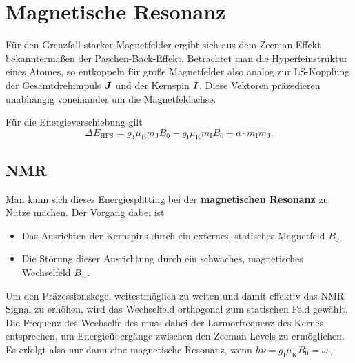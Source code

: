 \section{Magnetische Resonanz}
Für den Grenzfall starker Magnetfelder ergibt sich aus dem Zeeman-Effekt bekanntermaßen der Paschen-Back-Effekt.
Betrachtet man die Hyperfeinstruktur eines Atomes, so entkoppeln für große Magnetfelder also analog zur LS-Kopplung der Gesamtdrehimpuls $\boldsymbol{J}$ und der Kernspin $\boldsymbol{I}$.
Diese Vektoren präzedieren unabhängig voneinander um die Magnetfeldachse.

Für die Energieverschiebung gilt
\begin{equation*}
	\Delta E_\text{HFS} = g_\text{J}\mu_\text{B}m_\text{J}B_0 - g_\text{I}\mu_\text{K}m_\text{I}B_0 + a\cdot m_\text{I}m_\text{J}.
\end{equation*}

\subsection{NMR}
Man kann sich dieses Energiesplitting bei der \textbf{magnetischen Resonanz} zu Nutze machen.
Der Vorgang dabei ist
\begin{itemize}
	\item Das Ausrichten der Kernspins durch ein externes, statisches Magnetfeld $B_0$.
	\item Die Störung dieser Ausrichtung durch ein schwaches, magnetisches Wechselfeld $B_\sim$.
\end{itemize}
Um den Präzessionskegel weitestmöglich zu weiten und damit effektiv das NMR-Signal zu erhöhen, wird das Wechselfeld orthogonal zum statischen Feld gewählt.
Die Frequenz des Wechselfeldes muss dabei der Larmorfrequenz des Kernes entsprechen, um Energieübergänge zwischen den Zeeman-Levels zu ermöglichen.
Es erfolgt also nur dann eine magnetische Resonanz, wenn $h\nu = g_\text{I}\mu_\text{K}B_0=\omega_\text{L}$.

